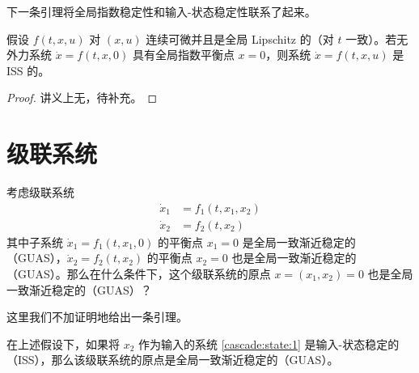 下一条引理将全局指数稳定性和输入-状态稳定性联系了起来。

\begin{lemma}\label{ISS_lemma}
    假设 $f(t, x, u)$ 对 $(x, u)$ 连续可微并且是全局 Lipschitz 的（对 $t$ 一致）。若无外力系统 $\dot{x} = f (t, x, 0)$ 具有全局指数平衡点 $x = 0$，则系统 $\dot{x} = f (t, x, u)$ 是 ISS 的。
\end{lemma}

\begin{proof}
    讲义上无，待补充。%
\end{proof}


\section*{级联系统}

考虑级联系统
\begin{subequations}
    \begin{align}
        \dot{x}_1 & = f_1 (t, x_1, x_2)  \label{cascade:state:1}\\
        \dot{x}_2 & = f_2 (t, x_2)  \label{cascade:state:2}
    \end{align}
\end{subequations}
其中子系统 $\dot{x}_1 = f_1 (t, x_1, 0)$ 的平衡点 $x_1 = 0$ 是全局一致渐近稳定的（GUAS），$\dot{x}_2 = f_2(t, x_2)$ 的平衡点 $x_2 = 0$ 也是全局一致渐近稳定的（GUAS）。那么在什么条件下，这个级联系统的原点 $x = (x_1, x_2) = 0$ 也是全局一致渐近稳定的（GUAS）？

这里我们不加证明地给出一条引理。
\begin{lemma}
    在上述假设下，如果将 $x_2$ 作为输入的系统 \eqref{cascade:state:1} 是输入-状态稳定的（ISS），那么该级联系统的原点是全局一致渐近稳定的（GUAS）。
\end{lemma}
